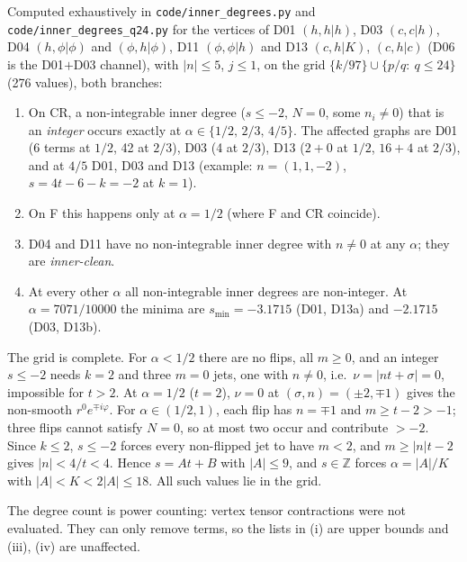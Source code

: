\begin{theorem}\label{thm:inner}
Computed exhaustively in \texttt{code/inner\_degrees.py} and \texttt{code/inner\_degrees\_q24.py} for the vertices of D01 $(h,h|h)$, D03 $(c,c|h)$, D04 $(h,\phi|\phi)$ and $(\phi,h|\phi)$, D11 $(\phi,\phi|h)$ and D13 $(c,h|K)$, $(c,h|c)$ (D06 is the D01$+$D03 channel), with $|n|\le5$, $j\le1$, on the grid $\{k/97\}\cup\{p/q:\ q\le24\}$ (276 values), both branches:
\begin{enumerate}
\item[(i)] On CR, a non-integrable inner degree ($s\le-2$, $N=0$, some $n_i\ne0$) that is an \emph{integer} occurs exactly at $\alpha\in\{1/2,\,2/3,\,4/5\}$. The affected graphs are D01 (6 terms at $1/2$, 42 at $2/3$), D03 (4 at $2/3$), D13 ($2+0$ at $1/2$, $16+4$ at $2/3$), and at $4/5$ D01, D03 and D13 (example: $n=(1,1,-2)$, $s=4t-6-k=-2$ at $k=1$).
\item[(ii)] On F this happens only at $\alpha=1/2$ (where F and CR coincide).
\item[(iii)] D04 and D11 have no non-integrable inner degree with $n\ne0$ at any $\alpha$; they are \emph{inner-clean}.
\item[(iv)] At every other $\alpha$ all non-integrable inner degrees are non-integer. At $\alpha=7071/10000$ the minima are $s_{\min}=-3.1715$ (D01, D13a) and $-2.1715$ (D03, D13b).
\end{enumerate}
The grid is complete. For $\alpha<1/2$ there are no flips, all $m\ge0$, and an integer $s\le-2$ needs $k=2$ and three $m=0$ jets, one with $n\ne0$, i.e.\ $\nu=|nt+\sigma|=0$, impossible for $t>2$. At $\alpha=1/2$ ($t=2$), $\nu=0$ at $(\sigma,n)=(\pm2,\mp1)$ gives the non-smooth $r^0e^{\mp i\varphi}$. For $\alpha\in(1/2,1)$, each flip has $n=\mp1$ and $m\ge t-2>-1$; three flips cannot satisfy $N=0$, so at most two occur and contribute $>-2$. Since $k\le2$, $s\le-2$ forces every non-flipped jet to have $m<2$, and $m\ge|n|t-2$ gives $|n|<4/t<4$. Hence $s=At+B$ with $|A|\le9$, and $s\in\mathbb Z$ forces $\alpha=|A|/K$ with $|A|<K<2|A|\le18$. All such values lie in the grid.
\end{theorem}
The degree count is power counting: vertex tensor contractions were not evaluated. They can only remove terms, so the lists in (i) are upper bounds and (iii), (iv) are unaffected.
